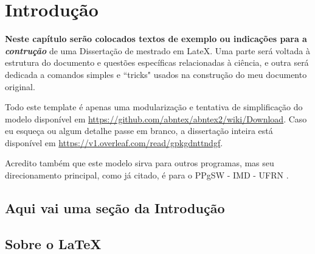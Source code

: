 \chapter{Introdução}
\label{cap:cap1}

\textbf{Neste capítulo serão colocados textos de exemplo ou indicações para a \textit{contrução}} de uma Dissertação de mestrado em LateX. Uma parte será voltada à estrutura do documento e questões específicas relacionadas à ciência, e outra será dedicada a comandos simples e ``tricks" usados na construção do meu documento original.

Todo este template é apenas uma modularização e tentativa de simplificação do modelo disponível em \url{https://github.com/abntex/abntex2/wiki/Download}. Caso eu esqueça ou algum detalhe passe em branco, a dissertação inteira está disponível em \url{https://v1.overleaf.com/read/gpkgdnttndgf}.

Acredito também que este modelo sirva para outros programas, mas seu direcionamento principal, como já citado, é para o PPgSW - IMD - UFRN \cite{xiao_study_2011}. %

\section{Aqui vai uma seção da Introdução}

\section{Sobre o \LaTeX}